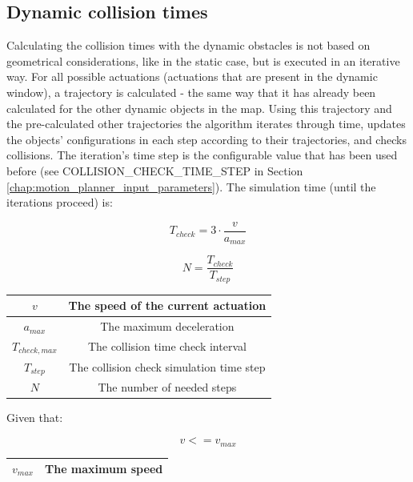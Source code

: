 \subsection{Dynamic collision times}
Calculating the collision times with the dynamic obstacles is not based on geometrical considerations, like in the static case, but is executed in an iterative way. For all possible actuations (actuations that are present in the dynamic window), a trajectory is calculated - the same way that it has already been calculated for the other dynamic objects in the map. Using this trajectory and the pre-calculated other trajectories the algorithm iterates through time, updates the objects' configurations in each step according to their trajectories, and checks collisions. The iteration's time step is the configurable value that has been used before (see COLLISION\_CHECK\_TIME\_STEP in Section \ref{chap:motion_planner_input_parameters}). The simulation time (until the iterations proceed) is:

\begin{equation}\label{eq:collision_check_time}
T_{check} = 3 \cdot \frac{v}{a_{max}}
\end{equation}

\begin{equation}\label{eq:collision_check_steps}
N = \frac{T_{check}}{T_{step}}
\end{equation}

\begin{center}
    \begin{tabular}{ | c | c | }
        \hline
        $v$             & The speed of the current actuation        \\
        \hline
        $a_{max}$       & The maximum deceleration                  \\
        \hline
        $T_{check,max}$ & The collision time check interval         \\
        \hline
        $T_{step}$      & The collision check simulation time step  \\
        \hline
        $N$             & The number of needed steps                \\
        \hline
    \end{tabular}
\end{center}

Given that:

\[ v <= v_{max} \]

\begin{center}
    \begin{tabular}{ | c | c | }
        \hline
        $v_{max}$    & The maximum speed        \\
        \hline
    \end{tabular}
\end{center}

